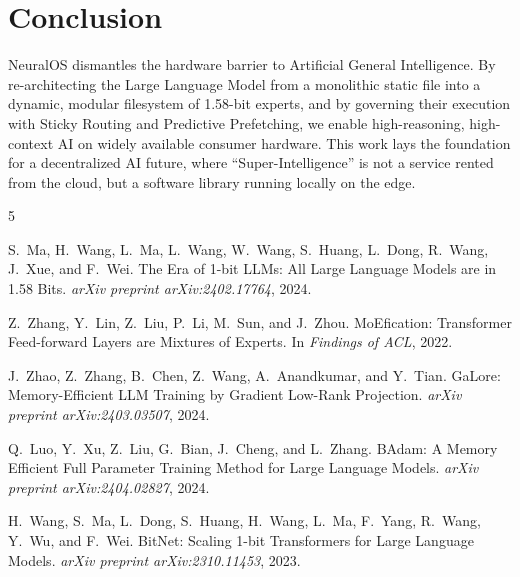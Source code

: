 \documentclass[11pt,twocolumn]{article}
\begin{document}
\section{Conclusion}

NeuralOS dismantles the hardware barrier to Artificial General Intelligence. By re-architecting the Large Language Model from a monolithic static file into a dynamic, modular filesystem of 1.58-bit experts, and by governing their execution with Sticky Routing and Predictive Prefetching, we enable high-reasoning, high-context AI on widely available consumer hardware. This work lays the foundation for a decentralized AI future, where ``Super-Intelligence'' is not a service rented from the cloud, but a software library running locally on the edge.


\begin{thebibliography}{5}

S.~Ma, H.~Wang, L.~Ma, L.~Wang, W.~Wang, S.~Huang, L.~Dong, R.~Wang, J.~Xue, and F.~Wei.
\newblock The Era of 1-bit LLMs: All Large Language Models are in 1.58 Bits.
\newblock \emph{arXiv preprint arXiv:2402.17764}, 2024.

Z.~Zhang, Y.~Lin, Z.~Liu, P.~Li, M.~Sun, and J.~Zhou.
\newblock MoEfication: Transformer Feed-forward Layers are Mixtures of Experts.
\newblock In \emph{Findings of ACL}, 2022.

J.~Zhao, Z.~Zhang, B.~Chen, Z.~Wang, A.~Anandkumar, and Y.~Tian.
\newblock GaLore: Memory-Efficient LLM Training by Gradient Low-Rank Projection.
\newblock \emph{arXiv preprint arXiv:2403.03507}, 2024.

Q.~Luo, Y.~Xu, Z.~Liu, G.~Bian, J.~Cheng, and L.~Zhang.
\newblock BAdam: A Memory Efficient Full Parameter Training Method for Large Language Models.
\newblock \emph{arXiv preprint arXiv:2404.02827}, 2024.

H.~Wang, S.~Ma, L.~Dong, S.~Huang, H.~Wang, L.~Ma, F.~Yang, R.~Wang, Y.~Wu, and F.~Wei.
\newblock BitNet: Scaling 1-bit Transformers for Large Language Models.
\newblock \emph{arXiv preprint arXiv:2310.11453}, 2023.

\end{thebibliography}
\end{document}
